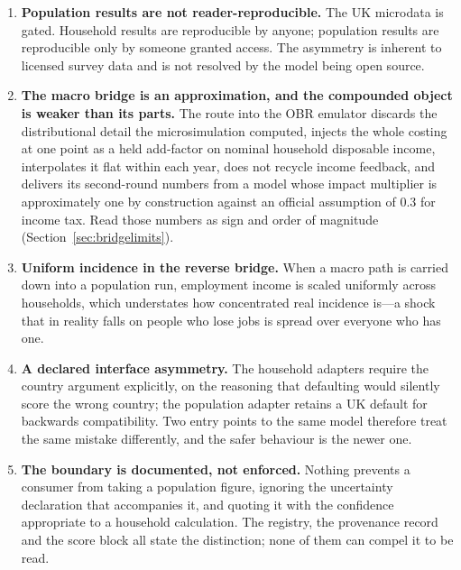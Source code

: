 \begin{enumerate}
\item \textbf{Population results are not reader-reproducible.} The UK microdata is gated. Household results are reproducible by anyone; population results are reproducible only by someone granted access. The asymmetry is inherent to licensed survey data and is not resolved by the model being open source.

\item \textbf{The macro bridge is an approximation, and the compounded object is weaker than its parts.} The route into the OBR emulator discards the distributional detail the microsimulation computed, injects the whole costing at one point as a held add-factor on nominal household disposable income, interpolates it flat within each year, does not recycle income feedback, and delivers its second-round numbers from a model whose impact multiplier is approximately one by construction against an official assumption of 0.3 for income tax. Read those numbers as sign and order of magnitude (Section~\ref{sec:bridgelimits}).

\item \textbf{Uniform incidence in the reverse bridge.} When a macro path is carried down into a population run, employment income is scaled uniformly across households, which understates how concentrated real incidence is---a shock that in reality falls on people who lose jobs is spread over everyone who has one.

\item \textbf{A declared interface asymmetry.} The household adapters require the country argument explicitly, on the reasoning that defaulting would silently score the wrong country; the population adapter retains a UK default for backwards compatibility. Two entry points to the same model therefore treat the same mistake differently, and the safer behaviour is the newer one.

\item \textbf{The boundary is documented, not enforced.} Nothing prevents a consumer from taking a population figure, ignoring the uncertainty declaration that accompanies it, and quoting it with the confidence appropriate to a household calculation. The registry, the provenance record and the score block all state the distinction; none of them can compel it to be read.
\end{enumerate}
